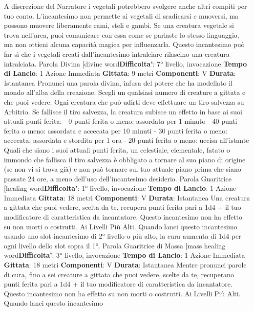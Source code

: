 \begin{multicols}{2}
A discrezione del Narratore i vegetali potrebbero svolgere
anche altri compiti per tuo conto. L’incantesimo non
permette ai vegetali di sradicarsi e muoversi, ma
possono muovere liberamente rami, steli e gambi.
Se una creatura vegetale si trova nell’area, puoi
comunicare con essa come se parlaste lo stesso
linguaggio, ma non ottieni alcuna capacità magica per
influenzarla.
Questo incantesimo può far sì che i vegetali creati
dall’incantesimo intralciare rilascino una creatura
intralciata.
Parola Divina
[divine word\textbf{Difficolta'}:
7° livello, invocazione
\textbf{Tempo di Lancio}: 1 Azione Immediata
\textbf{Gittata}: 9 metri
\textbf{Componenti}: V
\textbf{Durata}: Istantanea
Pronunci una parola divina, infusa del potere che ha
modellato il mondo all’alba della creazione. Scegli un
qualsiasi numero di creature a gittata e che puoi
vedere. Ogni creatura che può udirti deve effettuare un
tiro salvezza su Arbitrio. Se fallisce il tiro salvezza, la
creatura subisce un effetto in base ai suoi attuali punti
ferita:
- 0 punti ferita o meno: assordata per 1 minuto
- 40 punti ferita o meno: assordata e accecata per 10
minuti
- 30 punti ferita o meno: accecata, assordata e
stordita per 1 ora
- 20 punti ferita o meno: uccisa all’istante
Quali che siano i suoi attuali punti ferita, un celestiale,
elementale, fatato o immondo che fallisca il tiro
salvezza è obbligato a tornare al suo piano di origine
(se non vi si trova già) e non può tornare sul tuo attuale
piano prima che siano passate 24 ore, a meno dell’uso
dell’incantesimo desiderio.
Parola Guaritrice
[healing word\textbf{Difficolta'}:
1° livello, invocazione
\textbf{Tempo di Lancio}: 1 Azione Immediata
\textbf{Gittata}: 18 metri
\textbf{Componenti}: V
\textbf{Durata}: Istantanea
Una creatura a gittata che puoi vedere, scelta da te,
recupera punti ferita pari a 1d4 + il tuo modificatore di
caratteristica da incantatore. Questo incantesimo non
ha effetto su non morti o costrutti.
Ai Livelli Più Alti. Quando lanci questo incantesimo
usando uno slot incantesimo di 2° livello o più alto, la
cura aumenta di 1d4 per ogni livello dello slot sopra il
1°.
Parola Guaritrice di Massa
[mass healing word\textbf{Difficolta'}:
3° livello, invocazione
\textbf{Tempo di Lancio}: 1 Azione Immediata
\textbf{Gittata}: 18 metri
\textbf{Componenti}: V
\textbf{Durata}: Istantanea
Mentre pronunci parole di cura, fino a sei creature a
gittata che puoi vedere, scelte da te, recuperano punti
ferita pari a 1d4 + il tuo modificatore di caratteristica da
incantatore. Questo incantesimo non ha effetto su non
morti o costrutti.
Ai Livelli Più Alti. Quando lanci questo incantesimo

\end{multicols}
